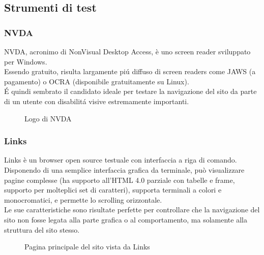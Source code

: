 \documentclass{article}
\begin{document}
\subsection{Strumenti di test}
\subsubsection*{NVDA}
NVDA, acronimo di NonVisual Desktop Access, è uno screen reader sviluppato per Windows.\\
Essendo gratuito, risulta largamente piú diffuso di screen readers come JAWS (a pagamento) o OCRA (disponibile gratuitamente su Linux).\\
É quindi sembrato il candidato ideale per testare la navigazione del sito da parte di un utente con disabilitá visive estremamente importanti.
\begin{figure}[H]
	\centering
	\caption{Logo di NVDA}
\end{figure}
\subsubsection*{Links}
Links è un browser open source testuale con interfaccia a riga di comando.\\
Disponendo di una semplice interfaccia grafica da terminale, può visualizzare pagine complesse (ha supporto all'HTML 4.0 parziale con tabelle e frame, supporto per molteplici set di caratteri), supporta terminali a colori e monocromatici, e permette lo scrolling orizzontale.\\
Le sue caratteristiche sono risultate perfette per controllare che la navigazione del sito non fosse legata alla parte grafica o al comportamento, ma solamente alla struttura del sito stesso.

\begin{figure}[H]
	\centering
	\caption{Pagina principale del sito vista da Links}
\end{figure}
\end{document}
